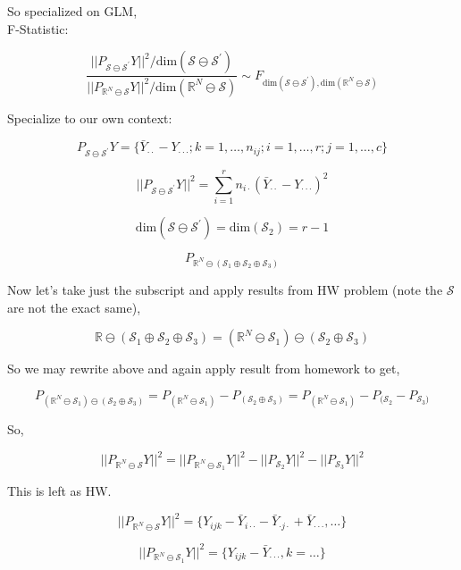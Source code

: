 \documentclass[11pt,fleqn]{book} %
\begin{document}
So specialized on GLM, \\

	F-Statistic: 

			$$\frac{||P_{\mathcal{S} \ominus \mathcal{S}^\prime} Y || ^2 / \text{dim}(\mathcal{S} \ominus \mathcal{S}^\prime)}{|| P_{\mathbb{R}^N \ominus \mathcal{S}} Y|| ^2 / \text{dim}(\mathbb{R}^N \ominus \mathcal{S})} \sim F_{\text{dim}(\mathcal{S} \ominus \mathcal{S}^\prime), \text{dim}(\mathbb{R}^N \ominus \mathcal{S})} $$

	Specialize to our own context: 

			$$P_{\mathcal{S} \ominus \mathcal{S}^\prime} Y = \{\bar{Y}_{\cdot \cdot} - Y_{\cdot \cdot \cdot}; k= 1, \dots, n_{ij}; i = 1, \dots, r; j = 1, \dots, c \} $$

			$$||P_{\mathcal{S} \ominus \mathcal{S}^\prime} Y||^2 = \sum^r_{i=1} n_{i \cdot} (\bar{Y}_{\cdot \cdot} - Y_{\cdot \cdot \cdot})^2 $$


			$$\text{dim}(\mathcal{S} \ominus \mathcal{S}^\prime) = \text{dim}(\mathcal{S}_2) = r - 1 $$

			$$P_{\mathbb{R}^N \ominus (\mathcal{S}_1 \oplus \mathcal{S}_2 \oplus \mathcal{S}_3)}  $$

Now let's take just the subscript and apply results from HW problem (note the $\mathcal{S}$ are not the exact same), 

			$$\mathbb{R} \ominus (\mathcal{S}_1 \oplus \mathcal{S}_2 \oplus \mathcal{S}_3) = (\mathbb{R}^N \ominus \mathcal{S}_1) \ominus (\mathcal{S}_2 \oplus \mathcal{S}_3) $$

So we may rewrite above and again apply result from homework to get, 

			$$P_{(\mathbb{R}^N \ominus \mathcal{S}_1) \ominus (\mathcal{S}_2 \oplus \mathcal{S}_3)} =  P_{(\mathbb{R}^N \ominus \mathcal{S}_1)}  - P_{(\mathcal{S}_2 \oplus \mathcal{S}_3)} = P_{(\mathbb{R}^N \ominus \mathcal{S}_1)}  - P_{(\mathcal{S}_2} - P_{\mathcal{S}_3)} $$

So, 

			$$||P_{\mathbb{R}^N \ominus \mathcal{S}} Y|| ^2 = ||P_{\mathbb{R}^N \ominus \mathcal{S}_1} Y|| ^2 - ||P_{\mathcal{S}_2} Y|| ^2 - ||P_{ \mathcal{S}_3} Y|| ^2 $$

This is left as HW. 


		$$||P_{\mathbb{R}^N \ominus \mathcal{S}} Y|| ^2 = \{Y_{ijk} - \bar{Y}_{i \cdot \cdot} - \bar{Y}_{ \cdot j \cdot} + \bar{Y}_{\cdot \cdot \cdot}, \dots\} $$

		$$||P_{\mathbb{R}^N \ominus \mathcal{S}_1} Y|| ^2 = \{ Y_{ijk} - \bar{Y}_{\cdot \cdot \cdot}, k = \dots \} $$
\end{document}
